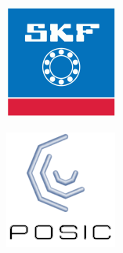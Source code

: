 \begin{figure}[h!]
\begin{subfigure}[h]{0.15\textheight}
        \includegraphics[width=\textwidth]{images/sponsors/skf}
    \end{subfigure}%
    \hspace{1cm}
    \begin{subfigure}[h]{0.15\textheight}
        \includegraphics[width=\textwidth]{images/sponsors/posic}
    \end{subfigure}
\vspace{0.4cm}



\end{figure}
